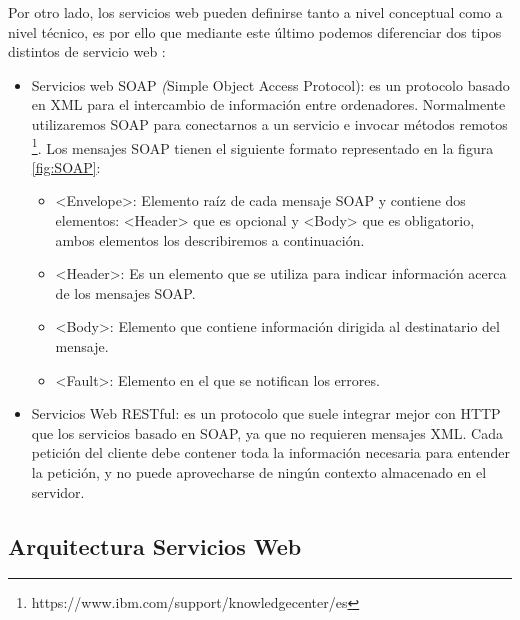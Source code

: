 Por otro lado, los servicios web pueden definirse tanto a nivel conceptual como a nivel técnico, es por ello que mediante este último podemos diferenciar dos tipos distintos de servicio web \citep{TorresJoaquin2017SC}:
\begin{itemize}
	\item Servicios web SOAP  \textit({Simple Object Access Protocol}): es un protocolo basado en XML para el intercambio de información entre ordenadores. Normalmente utilizaremos SOAP para conectarnos a un servicio e invocar métodos remotos 
	\footnote{https://www.ibm.com/support/knowledgecenter/es}. Los mensajes SOAP tienen el siguiente formato representado en la figura \ref{fig:SOAP}:

	
	\begin{itemize}
		\item <Envelope>: Elemento raíz de cada mensaje SOAP y contiene dos elementos: <Header> que es opcional y <Body> que es obligatorio, ambos elementos los describiremos a continuación.
		\item <Header>: Es un elemento que se utiliza para indicar información acerca de los mensajes SOAP.
		\item <Body>: Elemento que contiene información dirigida al destinatario del mensaje.
		\item <Fault>: Elemento en el que se notifican los errores.
			
	\end{itemize}

	\item Servicios Web RESTful: es un protocolo que suele integrar mejor con HTTP que los servicios basado en SOAP, ya que no requieren mensajes XML. Cada petición del cliente debe contener toda la información necesaria para entender la petición, y no puede aprovecharse de ningún contexto almacenado en el servidor.
	
\end{itemize}


\subsection{Arquitectura Servicios Web}
\label{cap:subsec:arquitecturaserviciosweb}

